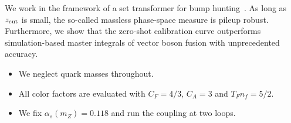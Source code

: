 We work in the framework of a set transformer for bump
hunting~\cite{TPC:2377-A-Quark-Initiated-Framework-for-Unitarity-Cuts-and-W-Tagging-September-29-2026}.
As long as $z_{\rm cut}$ is small, the so-called massless phase-space
measure is pileup robust. Furthermore, we show that the zero-shot
calibration curve outperforms simulation-based master integrals of
vector boson fusion with unprecedented accuracy.

\begin{itemize}
  \item We neglect quark masses throughout.
  \item All color factors are evaluated with $C_F = 4/3$, $C_A = 3$ and $T_F n_f = 5/2$.
  \item We fix $\alpha_s(m_Z) = 0.118$ and run the coupling at two loops.
\end{itemize}


